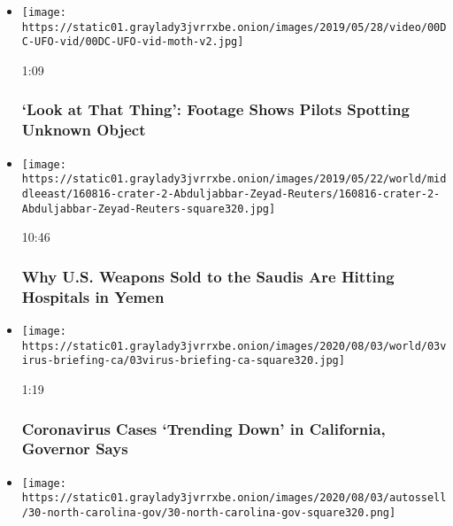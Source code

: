\begin{itemize}
\item
  \href{https://www.nytimes3xbfgragh.onion/video/us/100000006525294/ufo-video-navy.html?action=click\&module=video-series-bar\&region=header\&pgtype=Article\&playlistId=video/u-s}{}

  \texttt{[image: https://static01.graylady3jvrrxbe.onion/images/2019/05/28/video/00DC-UFO-vid/00DC-UFO-vid-moth-v2.jpg]}

  1:09

  \hypertarget{look-at-that-thing-footage-shows-pilots-spotting-unknown-object}{%
  \subsubsection{`Look at That Thing': Footage Shows Pilots Spotting
  Unknown
  Object}\label{look-at-that-thing-footage-shows-pilots-spotting-unknown-object}}
\item
  \href{https://www.nytimes3xbfgragh.onion/video/world/middleeast/100000006466384/yemen-war-saudi-arabia-usa.html?action=click\&module=video-series-bar\&region=header\&pgtype=Article\&playlistId=video/u-s}{}

  \texttt{[image: https://static01.graylady3jvrrxbe.onion/images/2019/05/22/world/middleeast/160816-crater-2-Abduljabbar-Zeyad-Reuters/160816-crater-2-Abduljabbar-Zeyad-Reuters-square320.jpg]}

  10:46

  \hypertarget{why-us-weapons-sold-to-the-saudis-are-hitting-hospitals-in-yemen}{%
  \subsubsection{Why U.S. Weapons Sold to the Saudis Are Hitting
  Hospitals in
  Yemen}\label{why-us-weapons-sold-to-the-saudis-are-hitting-hospitals-in-yemen}}
\item
  \href{https://www.nytimes3xbfgragh.onion/video/us/100000007271181/california-virus-cases-trend-down.html?action=click\&module=video-series-bar\&region=header\&pgtype=Article\&playlistId=video/u-s}{}

  \texttt{[image: https://static01.graylady3jvrrxbe.onion/images/2020/08/03/world/03virus-briefing-ca/03virus-briefing-ca-square320.jpg]}

  1:19

  \hypertarget{coronavirus-cases-trending-down-in-california-governor-says}{%
  \subsubsection{Coronavirus Cases `Trending Down' in California,
  Governor
  Says}\label{coronavirus-cases-trending-down-in-california-governor-says}}
\item
  \texttt{[image: https://static01.graylady3jvrrxbe.onion/images/2020/08/03/autossell/30-north-carolina-gov/30-north-carolina-gov-square320.png]}


\end{itemize}
